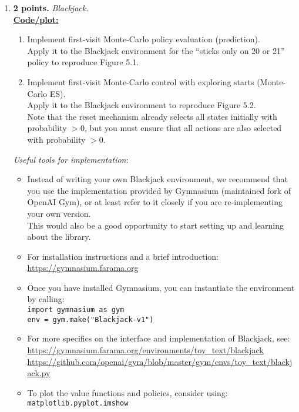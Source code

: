 \documentclass{article}
\begin{document}
\begin{enumerate}
	\item \textbf{2 points.} \textit{Blackjack.} \\
	      \uline{\textbf{Code/plot:}}
	      \begin{enumerate}
		      \item Implement first-visit Monte-Carlo policy evaluation (prediction). \\
		            Apply it to the Blackjack environment for the ``sticks only on 20 or 21'' policy to reproduce Figure 5.1.
		      \item Implement first-visit Monte-Carlo control with exploring starts (Monte-Carlo ES). \\
		            Apply it to the Blackjack environment to reproduce Figure 5.2. \\
		            Note that the reset mechanism already selects all states initially with probability $> 0$, but you must ensure that all actions are also selected with probability $> 0$.
	      \end{enumerate}
	      \textit{Useful tools for implementation}:
	      \begin{itemize}
		      \item Instead of writing your own Blackjack environment, we recommend that you use the implementation provided by Gymnasium (maintained fork of OpenAI Gym), or at least refer to it closely if you are re-implementing your own version. \\
		            This would also be a good opportunity to start setting up and learning about the library.
		      \item For installation instructions and a brief introduction: \url{https://gymnasium.farama.org}
		      \item Once you have installed Gymnasium, you can instantiate the environment by calling: \\
		            \texttt{import gymnasium as gym} \\
		            \texttt{env = gym.make("Blackjack-v1")}
		      \item For more specifics on the interface and implementation of Blackjack, see: \\
                        \url{https://gymnasium.farama.org/environments/toy_text/blackjack} \\
		            \url{https://github.com/openai/gym/blob/master/gym/envs/toy_text/blackjack.py}
		      \item To plot the value functions and policies, consider using: \texttt{matplotlib.pyplot.imshow}
	      \end{itemize}


\end{enumerate}
\end{document}
